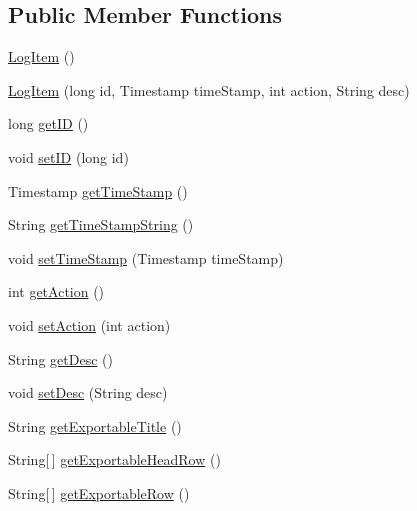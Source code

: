 \subsection*{Public Member Functions}
\begin{DoxyCompactItemize}
\item 
\hyperlink{classw3se_1_1_model_1_1_base_1_1_log_item_a6e1fc14a3fd65b879edced4929fc34f1}{Log\-Item} ()
\item 
\hyperlink{classw3se_1_1_model_1_1_base_1_1_log_item_a09f5fe45e1f5fe819baadf939fd3df4a}{Log\-Item} (long id, Timestamp time\-Stamp, int action, String desc)
\item 
long \hyperlink{classw3se_1_1_model_1_1_base_1_1_log_item_a92b9c9fca3f9173c9a03a1b637ae578a}{get\-I\-D} ()
\item 
void \hyperlink{classw3se_1_1_model_1_1_base_1_1_log_item_a89b5c978a3bef84b0378efd612ce6f9c}{set\-I\-D} (long id)
\item 
Timestamp \hyperlink{classw3se_1_1_model_1_1_base_1_1_log_item_a4fa798456b3fcc69a1c01174a3cd9645}{get\-Time\-Stamp} ()
\item 
String \hyperlink{classw3se_1_1_model_1_1_base_1_1_log_item_ab991d4606155aecfd54328c3df673e14}{get\-Time\-Stamp\-String} ()
\item 
void \hyperlink{classw3se_1_1_model_1_1_base_1_1_log_item_a83e14fdacc008bec389705e0b9a21e6f}{set\-Time\-Stamp} (Timestamp time\-Stamp)
\item 
int \hyperlink{classw3se_1_1_model_1_1_base_1_1_log_item_a6e88791cd9961e6d3927d78351c98ed7}{get\-Action} ()
\item 
void \hyperlink{classw3se_1_1_model_1_1_base_1_1_log_item_a478bca9071ac099c2b286f1fb9beb981}{set\-Action} (int action)
\item 
String \hyperlink{classw3se_1_1_model_1_1_base_1_1_log_item_abc64b4d1cd7ae607f4ce3cbcf0f15e7f}{get\-Desc} ()
\item 
void \hyperlink{classw3se_1_1_model_1_1_base_1_1_log_item_a8f9bdf163c0e2d9a805b52684e44ff8e}{set\-Desc} (String desc)
\item 
String \hyperlink{classw3se_1_1_model_1_1_base_1_1_log_item_a866ef8e5d2ef6c93508baa39c8049e20}{get\-Exportable\-Title} ()
\item 
String\mbox{[}$\,$\mbox{]} \hyperlink{classw3se_1_1_model_1_1_base_1_1_log_item_ae6637ae31cadac885753e0655311e0c8}{get\-Exportable\-Head\-Row} ()
\item 
String\mbox{[}$\,$\mbox{]} \hyperlink{classw3se_1_1_model_1_1_base_1_1_log_item_a3acaeef5de80633c25fe36879632144e}{get\-Exportable\-Row} ()
\end{DoxyCompactItemize}
